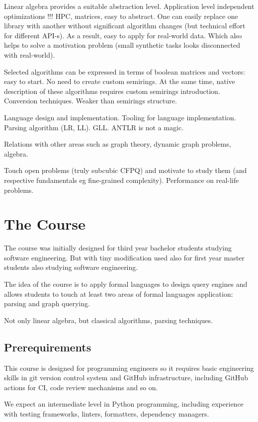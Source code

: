 \documentclass[sigconf]{acmart}
\begin{document}
Linear algebra provides a suitable abstraction level. Application level independent optimizations !!! HPC, matrices, easy to abstract.
One can easily replace one library with another without significant algorithm changes (but technical effort for different API-s).
As a result, easy to apply for real-world data.
Which also helps to solve a motivation problem (small synthetic tasks looks disconnected with real-world).

Selected algorithms can be expressed in terms of boolean matrices and vectors: easy to start.
No need to create custom semirings.
At the same time, native description of these algorithms requires custom semirings introduction.
Conversion techniques.
Weaker than semirings structure. 

Language design and implementation. 
Tooling for language implementation.
Parsing algorithm (LR, LL).
GLL. 
ANTLR is not a magic. 

Relations with other areas such as graph theory, dynamic graph problems, algebra.

Touch open problems (truly subcubic CFPQ) and motivate to study them (and respective fundamentals eg fine-grained complexity).
Performance on real-life problems.

\section{The Course}

The course was initially designed for third year bachelor students studying software engineering.
But with tiny modification used also for first year master students also studying software engineering.

The idea of the course is to apply formal languages to design query engines and allows students to touch at least two areas of formal languages application: parsing and graph querying.

Not only linear algebra, but classical algorithms, parsing techniques.

\subsection{Prerequirements}

This course is designed for programming engineers so it requires basic engineering skills in git version control system and GitHub infrastructure, including GitHub actions for CI, code review mechanisms and so on.

We expect an intermediate level in Python programming, including experience with testing frameworks, linters, formatters, dependency managers. 
\end{document}
